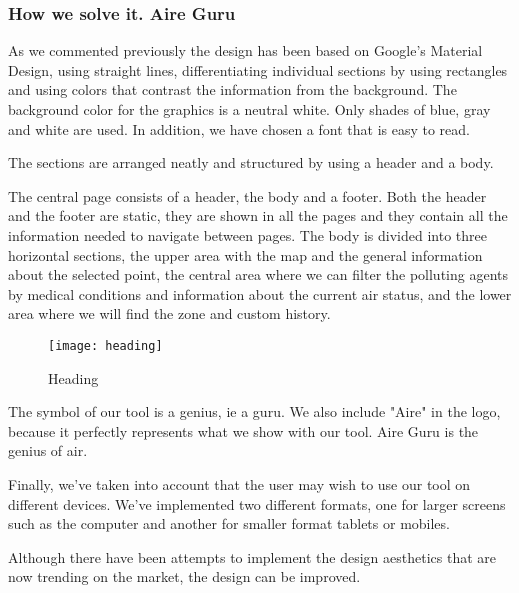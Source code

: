 \subsubsection{How we solve it. Aire Guru} 
As we commented previously the design has been based on Google's Material Design, using straight lines, differentiating individual sections by using rectangles and using colors that contrast the information from the background.
The background color for the graphics is a neutral white. Only shades of blue, gray and white are used. In addition, we have chosen a font that is easy to read.

The sections are arranged neatly and structured by using a header and a body.

The central page consists of a header, the body and a footer. Both the header and the footer are static,
they are shown in all the pages and they contain all the information needed to navigate between pages.
The body is divided into three horizontal sections, the upper area with the map and the general information about the selected point,
the central area where we can filter the polluting agents by medical conditions and information about the current air status, and the
lower area where we will find the zone and custom history.

\begin{figure}[ht]
    \centering
    \texttt{[image: heading]}
    \caption{Heading}
\end{figure}
 
    The symbol of our tool is a genius, ie a guru. We also include "Aire" in the logo, because it perfectly represents 
    what we show with our tool. Aire Guru is the genius of air.
    
    Finally, we've taken into account that the user may wish to use our tool on different devices. We've implemented
    two different formats, one for larger screens such as the computer and another for smaller format tablets or mobiles.
\begin{itemize}
    \done
    \crossed Although there have been attempts to implement the design aesthetics that are now trending on the market, the design can be improved.
    
\end{itemize}
\newpage